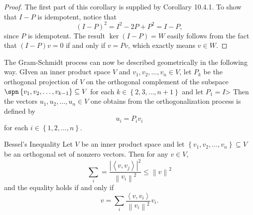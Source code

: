 \documentclass[linearalgebra]{subfiles}
\begin{document}
    \begin{proof}
        The first part of this corollary is supplied by Corollary 10.4.1. To show that $I-P$ is idempotent, notice that
        \begin{equation*}
            \left( I-P \right) ^2 = I^2 - 2P + P^2 = I - P,
        \end{equation*}
        since $P$ is idempotent. The result $\ker(I-P) = W$ easily follows from the fact that $(I-P)v = 0$ if and only if $v=Pv$, which exactly means $v\in W$.
    \end{proof}

    \begin{remark}
        The Gram-Schmidt process can now be described geometrically in the following way. GIven an inner product space $V$ and $v_1,v_2,\ldots,v_n\in V$, let $P_k$ be the orthogonal projection of $V$ on the orthogonal complement of the subspace $\spn\left\lbrace v_1,v_2,\ldots,v_{k-1} \right\rbrace \subseteq V$ for each $k\in\left\lbrace 2,3,\ldots,n+1 \right\rbrace$ and let $P_1=I$> Then the vectors $u_1,u_2,\ldots,u_n\in V$ one obtains from the orthogonalization process is defined by
        \begin{equation*}
            u_i = P_iv_i
        \end{equation*}
        for each $i\in\left\lbrace 1,2,\ldots,n \right\rbrace$.
    \end{remark}

    \begin{cor}{Bessel's Inequality}
        Let $V$ be an inner product space and let $\left\lbrace v_1,v_2,\ldots,v_n \right\rbrace \subseteq V$ be an orthogonal set of nonzero vectors. Then for any $v\in V$,
        \begin{equation*}
            \sum^{}_{i} = \frac{\left| \left\langle v, v_j\right\rangle  \right| ^2}{\left\lVert v_i\right\rVert ^2}\leq \left\lVert v\right\rVert ^2 
        \end{equation*}
        and the equality holds if and only if
        \begin{equation*}
            v = \sum^{}_{i} \frac{\left\langle v, v_i\right\rangle }{\left\lVert v_i\right\rVert ^2}v_i.
        \end{equation*}
    \end{cor}	
\end{document}

